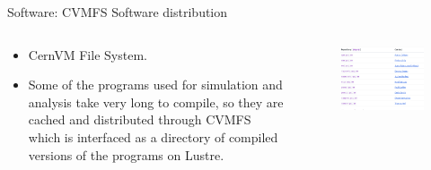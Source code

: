 \begin{frame}{Software: CVMFS Software distribution}
    \begin{columns}
        \begin{column}{0.6\textwidth}
            \begin{itemize}
                \item CernVM File System.
                \item Some of the programs used for simulation and analysis take very long to compile,
                      so they are cached and distributed through CVMFS which is interfaced as a directory of compiled
                      versions of the programs on Lustre.
            \end{itemize}
        \end{column}
        \begin{column}{0.4\textwidth}
            \begin{figure}
                \centering
                \includegraphics[width=\textwidth]{images/cvmfs_list.png}
            \end{figure}
        \end{column}
    \end{columns}

\end{frame}

